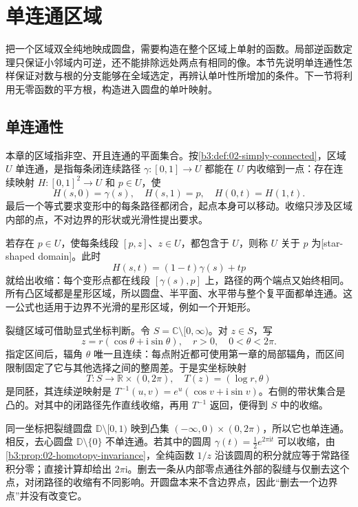 \section{单连通区域}
\label{b3:sec:0501}

把一个区域双全纯地映成圆盘，需要构造在整个区域上单射的函数。局部逆函数定理只保证小邻域内可逆，还不能排除远处两点有相同的像。本节先说明单连通性怎样保证对数与根的分支能够在全域选定，再辨认单叶性所增加的条件。下一节将利用无零函数的平方根，构造进入圆盘的单叶映射。

\subsection{单连通性}
\label{b3:subsec:050101}

本章的区域指非空、开且连通的平面集合。按\cref{b3:def:02-simply-connected}，区域 \(U\) 单连通，是指每条闭连续路径 \(\gamma:[0,1]\to U\) 都能在 \(U\) 内收缩到一点：存在连续映射 \(H:[0,1]^2\to U\) 和 \(p\in U\)，使
\[
 H(s,0)=\gamma(s),\quad H(s,1)=p,\quad H(0,t)=H(1,t).
\]
最后一个等式要求变形中的每条路径都闭合，起点本身可以移动。收缩只涉及区域内部的点，不对边界的形状或光滑性提出要求。

\ProseParagraphBreak

若存在 \(p\in U\)，使每条线段 \([p,z]\)、\(z\in U\)，都包含于 \(U\)，则称 \(U\) 关于 \(p\) 为[star-shaped domain]。此时
\[
 H(s,t)=(1-t)\gamma(s)+tp
\]
就给出收缩：每个变形点都在线段 \([\gamma(s),p]\) 上，路径的两个端点又始终相同。所有凸区域都是星形区域，所以圆盘、半平面、水平带与整个复平面都单连通。这一公式也适用于边界不光滑的星形区域，例如一个开矩形。

\ProseParagraphBreak

裂缝区域可借助显式坐标判断。令 \(S=\mathbb C\setminus[0,\infty)\)。对 \(z\in S\)，写
\[
 z=r(\cos\theta+\mathrm{i}\sin\theta),
 \quad r>0,\quad0<\theta<2\pi.
\]
指定区间后，辐角 \(\theta\) 唯一且连续：每点附近都可使用第一章的局部辐角，而区间限制固定了它与其他选择之间的整周差。于是实坐标映射
\[
 T:S\longrightarrow\mathbb R\times(0,2\pi),
 \quad T(z)=(\log r,\theta)
\]
是同胚，其连续逆映射是
\(T^{-1}(u,v)=e^u(\cos v+\mathrm{i}\sin v)\)。右侧的带状集合是凸的。对其中的闭路径先作直线收缩，再用 \(T^{-1}\) 返回，便得到 \(S\) 中的收缩。

\ProseParagraphBreak

同一坐标把裂缝圆盘 \(\mathbb D\setminus[0,1)\) 映到凸集 \(( -\infty,0)\times(0,2\pi)\)，所以它也单连通。相反，去心圆盘 \(\mathbb D\setminus\{0\}\) 不单连通。若其中的圆周 \(\gamma(t)=\tfrac12e^{2\pi\mathrm{i}t}\) 可以收缩，由\cref{b3:prop:02-homotopy-invariance}，全纯函数 \(1/z\) 沿该圆周的积分就应等于常路径积分零；直接计算却给出 \(2\pi\mathrm{i}\)。删去一条从内部零点通往外部的裂缝与仅删去这个点，对闭路径的收缩有不同影响。开圆盘本来不含边界点，因此“删去一个边界点”并没有改变它。

